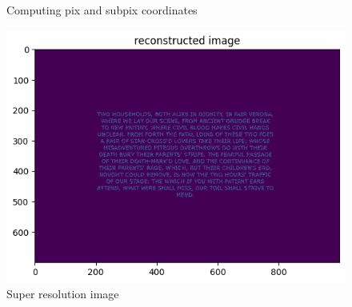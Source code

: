 \documentclass[10pt,letterpaper]{article}
\begin{document}
\begin{figure}[h]
     \centering
     \caption{Computing pix and subpix coordinates}
\end{figure}

\begin{figure}[h]
	\centering
	\includegraphics[scale=0.65]{solved text.png}
	\caption{Super resolution image}
	\label{fig:super}
\end{figure}
\end{document}
